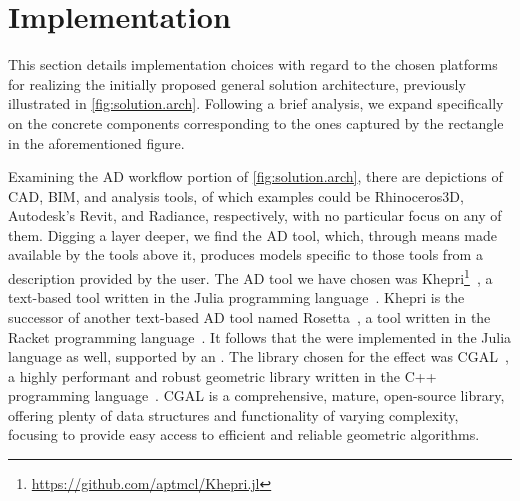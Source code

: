 \section{Implementation}%
\label{sec:solution.impl}

This section details implementation choices with regard to the chosen platforms
for realizing the initially proposed general solution architecture, previously
illustrated in \cref{fig:solution.arch}. Following a brief analysis, we expand
specifically on the concrete components corresponding to the ones captured by
the rectangle in the aforementioned figure.

Examining the \ac{AD} workflow portion of \cref{fig:solution.arch}, there are
depictions of \ac{CAD}, \ac{BIM}, and analysis tools, of which examples could be
Rhinoceros3D, Autodesk's Revit, and Radiance, respectively, with no particular
focus on any of them.  Digging a layer deeper, we find the \ac{AD} tool, which,
through means made available by the tools above it, produces models specific to
those tools from a description provided by the user.  The \ac{AD} tool we have
chosen was
Khepri\footnote{\url{https://github.com/aptmcl/Khepri.jl}}~\cite{Leitao:2019:GRUGEAV},
a text-based tool written in the Julia programming
language~\cite{Bezanson:2017:JAFANC}.  Khepri is the successor of another
text-based \ac{AD} tool named Rosetta~\cite{Leitao:2011:PGDCAD}, a tool written
in the Racket programming language~\cite{PLT:2010:Reference}.  It follows that
the \primitives{} were implemented in the Julia language as well, supported by
an \geomlibrary{}.  The library chosen for the effect was
\ac{CGAL}~\cite{CGAL:5.3:Project}, a highly performant and robust geometric
library written in the C++ programming language~\cite{Stroustrup:2013:CPP}.
\Ac{CGAL} is a comprehensive, mature, open-source library, offering plenty of
data structures and functionality of varying complexity, focusing to provide
easy access to efficient and reliable geometric algorithms.

